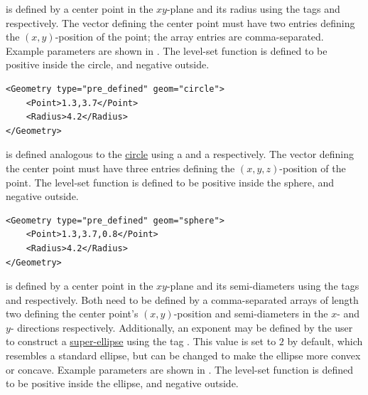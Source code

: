  is defined by a center point in the $xy$-plane and its radius using the tags  and  respectively. The vector defining the center point must have two entries defining the $(x,y)$-position of the point; the array entries are comma-separated. Example parameters are shown in . The level-set function is defined to be positive inside the circle, and negative outside.

\begin{minipage}{\linewidth}
\vspace{0.5cm}
\begin{lstlisting}[caption={Example parameters for defining a circle.},captionpos=b, label={lst:circle}]
<Geometry type="pre_defined" geom="circle"> 
    <Point>1.3,3.7</Point>
    <Radius>4.2</Radius>
</Geometry>
\end{lstlisting}
\end{minipage}

 is defined analogous to the \hyperlink{circle}{circle} using a  and a  respectively. The vector defining the center point must have three entries defining the $(x,y,z)$-position of the point. The level-set function is defined to be positive inside the sphere, and negative outside.

\begin{minipage}{\linewidth}
\vspace{0.5cm}
\begin{lstlisting}[caption={Example parameters for defining a circle.},captionpos=b, label={lst:sphere}]
<Geometry type="pre_defined" geom="sphere"> 
    <Point>1.3,3.7,0.8</Point>
    <Radius>4.2</Radius>
</Geometry>
\end{lstlisting}
\end{minipage}

 is defined by a center point in the $xy$-plane and its semi-diameters using the tags  and  respectively. Both need to be defined by a comma-separated arrays of length two defining the center point's $(x,y)$-position and semi-diameters in the $x$- and $y$- directions respectively. Additionally, an exponent may be defined by the user to construct a \href{https://en.wikipedia.org/wiki/Superellipse}{super-ellipse} using the tag . This value is set to $2$ by default, which resembles a standard ellipse, but can be changed to make the ellipse more convex or concave.
Example parameters are shown in . The level-set function is defined to be positive inside the ellipse, and negative outside.

